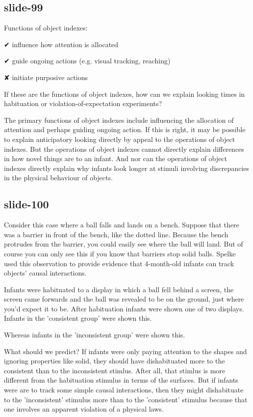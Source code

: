 \documentclass[12pt,\papersize]{extarticle}
\begin{document}
\subsection{slide-99}
Functions of object indexes:



✔ influence how attention is allocated



✔ guide ongoing actions (e.g. visual tracking, reaching)



✘ initiate purposive actions


If these are the functions of object indexes, how can we explain
looking times in habituation or violation-of-expectation experiments?

The primary functions of object indexes include influencing the allocation
of attention and perhaps guiding ongoing action.
If this is right, it may be possible to explain anticipatory looking
directly by appeal to the operations of  object indexes.
But the operations of object indexes cannot directly explain differences
in how novel things are to an infant.
And nor can the operations of object indexes directly explain why infants
look longer at stimuli involving discrepancies in the physical behaviour
of objects.

\subsection{slide-100}
Consider this case where a ball falls and lands on a bench.
Suppose that there was a barrier in front of the bench, like the dotted line.
Because the bench protrudes from the barrier, you could easily see where the ball will land.
But of course you can only see this if you know that barriers stop solid balls.
Spelke used this observation to provide evidence that 4-month-old infants can track objects' causal interactions.

Infants were habituated to a display in which a ball fell behind a screen,
the screen came forwards and the ball was revealed to be on the ground,
just where you'd expect it to be.
After habituation infants were shown one of two displays.
Infants in the 'consistent group' were shown this.

Whereas infants in the 'inconsistent group' were shown this.

What should we predict?
If infants were only paying attention to the shapes and ignoring properties
like solid, they should have dishabituated more to the consistent than to
the inconsistent stimlus.
After all, that stimlus is more different from the habituation stimulus in
terms of the surfaces.
But if infants were are to track some simple causal interactions, then they
might dishabituate to the 'inconsistent' stimulus more than to the
'consistent' stimulus because that one involves an apparent violation of a
physical laws.
\end{document}
